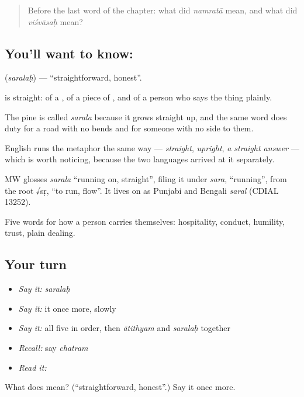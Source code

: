 \label{lesson:SA-C43-honest}



\begin{quote}
Before the last word of the chapter: what did \emph{namratā} mean, and what did \emph{viśvāsaḥ} mean?
\end{quote}

\subsection*{You'll want to know: }
\textbf{} (\emph{saralaḥ}) — \textquotedblleft{}straightforward, honest\textquotedblright{}.

\textbf{} is straight: of a , of a piece of , and of a person who says the thing plainly.

The pine is called \emph{sarala} because it grows straight up, and the same word does duty for a road with no bends and for someone with no side to them.

English runs the metaphor the same way — \emph{straight}, \emph{upright}, \emph{a straight answer} — which is worth noticing, because the two languages arrived at it separately.

\begin{cousinweb}
MW glosses \emph{sarala} \textquotedblleft{}running on, straight\textquotedblright{}, filing it under \emph{sara}, \textquotedblleft{}running\textquotedblright{}, from the root √sṛ, \textquotedblleft{}to run, flow\textquotedblright{}. It lives on as Punjabi and Bengali \emph{saral} (CDIAL 13252).
\end{cousinweb}

\begin{grammarlens}[title={What you've built}]
Five words for how a person carries themselves: hospitality, conduct, humility, trust, plain dealing.
\end{grammarlens}

\subsection*{Your turn}
\begin{itemize}
\raggedright
  \item \emph{Say it:} \emph{saralaḥ}
  \item \emph{Say it:} it once more, slowly
  \item \emph{Say it:} all five in order, then \emph{ātithyam} and \emph{saralaḥ} together
  \item \emph{Recall:} say \emph{chatram}
  \item \emph{Read it:} \textbf{}
\end{itemize}

\begin{tcolorbox}[breakable,colback=teal!4,colframe=teal!35!black,title={Before you move on}]
What does  mean? (\textquotedblleft{}straightforward, honest\textquotedblright{}.) Say it once more.
\end{tcolorbox}

